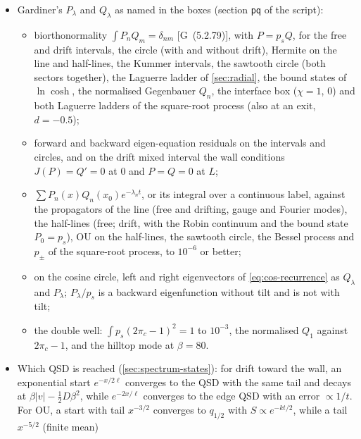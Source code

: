 \documentclass[11pt]{article}
\numberwithin{equation}{section}
\newcommand{\G}[1]{[G~(#1)]}
\begin{document}
\begin{itemize}
\begin{itemize}
                drift; and the rates of neutral Wright--Fisher from finite differences.
        \end{itemize}
  \item Gardiner's $P_\lambda$ and $Q_\lambda$ as named in the boxes (section \texttt{pq} of the script):
        \begin{itemize}
          \item biorthonormality $\int P_nQ_m=\delta_{nm}$ \G{5.2.79}, with $P=p_sQ$, for the free and drift intervals,
                the circle (with and without drift), Hermite on the line and half-lines, the Kummer intervals, the
                sawtooth circle (both sectors together), the Laguerre ladder of \cref{sec:radial}, the bound states of
                $\ln\cosh$, the normalised Gegenbauer $Q_n$, the interface box ($\chi=1$, $0$) and both Laguerre
                ladders of the square-root process (also at an exit, $d=-0.5$);
          \item forward and backward eigen-equation residuals on the intervals and circles, and on the drift mixed
                interval the wall conditions $J(P)=Q'=0$ at $0$ and $P=Q=0$ at $L$;
          \item $\sum P_n(x)Q_n(x_0)e^{-\lambda_nt}$, or its integral over a continuous label, against the propagators
                of the line (free and drifting, gauge and Fourier modes), the half-lines (free; drift, with the
                Robin continuum and the bound state $P_0=p_s$), OU on the half-lines, the sawtooth circle, the Bessel
                process and $p_\pm$ of the square-root process, to $10^{-6}$ or better;
          \item on the cosine circle, left and right eigenvectors of \cref{eq:cos-recurrence} as $Q_\lambda$ and
                $P_\lambda$; $P_\lambda/p_s$ is a backward eigenfunction without tilt and is not with tilt;
          \item the double well: $\int p_s(2\pi_c-1)^2=1$ to $10^{-3}$, the normalised $Q_1$ against $2\pi_c-1$, and
                the hilltop mode at $\beta=80$.
        \end{itemize}
  \item Which QSD is reached (\cref{sec:spectrum-states}): for drift toward the wall, an exponential start
        $e^{-x/2\ell}$ converges to the QSD with the same tail and decays at $\beta|v|-\frac12D\beta^2$, while
        $e^{-2x/\ell}$ converges to the edge QSD with an error $\propto1/t$. For OU, a start with tail
        $x^{-3/2}$ converges to $q_{1/2}$ with $S\propto e^{-kt/2}$, while a tail $x^{-5/2}$ (finite mean)

\end{itemize}
\end{document}
